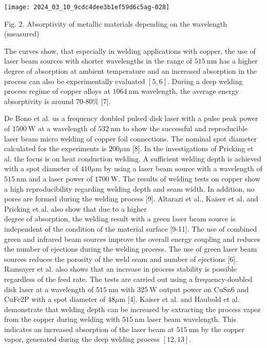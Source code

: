 \documentclass[10pt]{article}
\begin{document}
\begin{center}
\texttt{[image: 2024\_03\_10\_9cdc4dee3b1ef59d6c5ag-028]}
\end{center}

Fig. 2. Absorptivity of metallic materials depending on the wavelength (measured)

The curves show, that especially in welding applications with copper, the use of laser beam sources with shorter wavelengths in the range of $515 \mathrm{~nm}$ has a higher degree of absorption at ambient temperature and an increased absorption in the process can also be experimentally evaluated $[5,6]$. During a deep welding process regime of copper alloys at $1064 \mathrm{~nm}$ wavelength, the average energy absorptivity is around 70-80\% [7].

De Bono et al. us a frequency doubled pulsed disk laser with a pulse peak power of $1500 \mathrm{~W}$ at a wavelength of $532 \mathrm{~nm}$ to show the successful and reproducible laser beam micro welding of copper foil connections. The nominal spot diameter calculated for the experiments is $200 \mu \mathrm{m}$ [8]. In the investigations of Pricking et al. the focus is on heat conduction welding. A sufficient welding depth is achieved with a spot diameter of $410 \mu \mathrm{m}$ by using a laser beam source with a wavelength of $515 \mathrm{~nm}$ and a laser power of $1700 \mathrm{~W}$. The results of welding tests on copper show a high reproducibility regarding welding depth and seam width. In addition, no pores are formed during the welding process [9]. Altarazi et al., Kaiser et al. and Pricking et al. also show that due to a higher\\
degree of absorption, the welding result with a green laser beam source is independent of the condition of the material surface [9-11]. The use of combined green and infrared beam sources improve the overall energy coupling and reduces the number of ejections during the welding process. The use of green laser beam sources reduces the porosity of the weld seam and number of ejections [6]. Ramsayer et al. also shows that an increase in process stability is possible regardless of the feed rate. The tests are carried out using a frequency-doubled disk laser at a wavelength of $515 \mathrm{~nm}$ with $325 \mathrm{~W}$ output power on CuSn6 and CuFe2P with a spot diameter of $48 \mu \mathrm{m}$ [4]. Kaiser et al. and Haubold et al. demonstrate that welding depth can be increased by extracting the process vapor from the copper during welding with $515 \mathrm{~nm}$ laser beam wavelength. This indicates an increased absorption of the laser beam at $515 \mathrm{~nm}$ by the copper vapor, generated during the deep welding process $[12,13]$.
\end{document}
